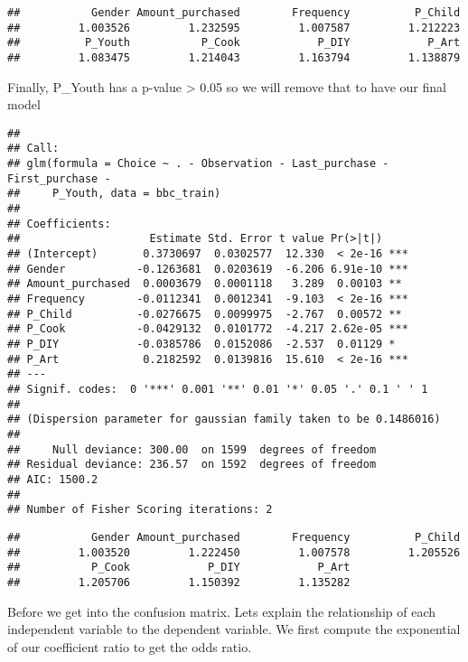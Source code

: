 \documentclass[
]{article}
\begin{document}
\begin{verbatim}
##           Gender Amount_purchased        Frequency          P_Child 
##         1.003526         1.232595         1.007587         1.212223 
##          P_Youth           P_Cook            P_DIY            P_Art 
##         1.083475         1.214043         1.163794         1.138879
\end{verbatim}

Finally, P\_Youth has a p-value \textgreater{} 0.05 so we will remove
that to have our final model

\begin{verbatim}
## 
## Call:
## glm(formula = Choice ~ . - Observation - Last_purchase - First_purchase - 
##     P_Youth, data = bbc_train)
## 
## Coefficients:
##                    Estimate Std. Error t value Pr(>|t|)    
## (Intercept)       0.3730697  0.0302577  12.330  < 2e-16 ***
## Gender           -0.1263681  0.0203619  -6.206 6.91e-10 ***
## Amount_purchased  0.0003679  0.0001118   3.289  0.00103 ** 
## Frequency        -0.0112341  0.0012341  -9.103  < 2e-16 ***
## P_Child          -0.0276675  0.0099975  -2.767  0.00572 ** 
## P_Cook           -0.0429132  0.0101772  -4.217 2.62e-05 ***
## P_DIY            -0.0385786  0.0152086  -2.537  0.01129 *  
## P_Art             0.2182592  0.0139816  15.610  < 2e-16 ***
## ---
## Signif. codes:  0 '***' 0.001 '**' 0.01 '*' 0.05 '.' 0.1 ' ' 1
## 
## (Dispersion parameter for gaussian family taken to be 0.1486016)
## 
##     Null deviance: 300.00  on 1599  degrees of freedom
## Residual deviance: 236.57  on 1592  degrees of freedom
## AIC: 1500.2
## 
## Number of Fisher Scoring iterations: 2
\end{verbatim}

\begin{verbatim}
##           Gender Amount_purchased        Frequency          P_Child 
##         1.003520         1.222450         1.007578         1.205526 
##           P_Cook            P_DIY            P_Art 
##         1.205706         1.150392         1.135282
\end{verbatim}

Before we get into the confusion matrix. Lets explain the relationship
of each independent variable to the dependent variable. We first compute
the exponential of our coefficient ratio to get the odds ratio.
\end{document}
